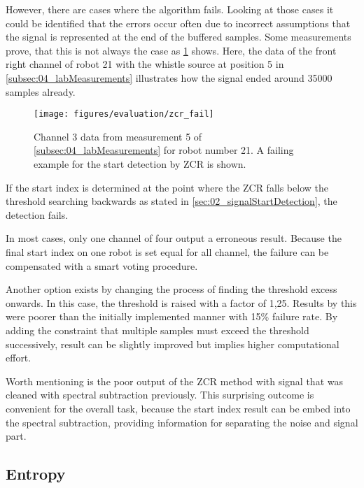 However, there are cases where the algorithm fails.
Looking at those cases it could be identified that
the errors occur often due to incorrect assumptions that
the signal is represented at the end of the buffered
samples.
Some measurements prove, that this is not always the case as \cref{fig:04_zcrFail} shows.
Here, the data of the front right channel of robot 21 with the whistle source
at position 5 in \cref{subsec:04_labMeasurements}
illustrates how the signal ended around 35000 samples already.
\begin{figure}[ht]
	\centering
	\texttt{[image: figures/evaluation/zcr\_fail]}
	\caption{Channel 3 data from measurement 5 of \cref{subsec:04_labMeasurements}
		for robot number 21. A failing example for the start detection by \ac{ZCR}
		is shown.}
	\label{fig:04_zcrFail}
\end{figure}
If the start index is determined at the point where the \ac{ZCR}
falls below the threshold searching backwards as stated in \cref{sec:02_signalStartDetection},
the detection fails.

In most cases, only one channel of four output a erroneous result.
Because the final start index on one robot is set equal for all channel,
the failure can be compensated with a smart voting procedure.

Another option exists by changing the process of finding the
threshold excess onwards.
In this case, the threshold is raised with a factor of 1,25.
Results by this were poorer than the initially implemented manner
with 15\si{\percent} failure rate.
By adding the constraint that multiple samples must exceed the
threshold successively, result can be slightly improved but implies higher
computational effort.

Worth mentioning is the poor output of the \ac{ZCR} method with
signal that was cleaned with spectral subtraction previously.
This surprising outcome is convenient for the overall task,
because the start index result can be embed into the spectral
subtraction, providing information for separating the noise
and signal part.

\subsection{Entropy}
\label{subsec:04_entropy}

